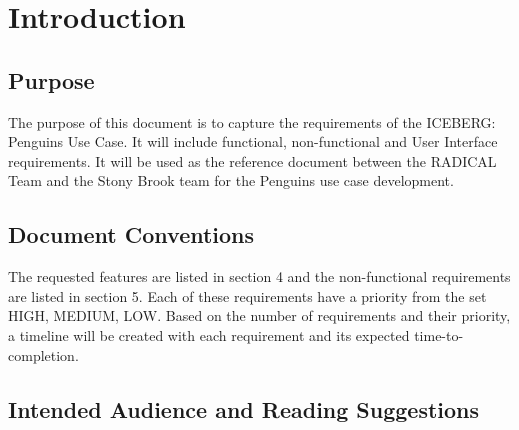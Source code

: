 \documentclass{scrreprt}
\begin{document}
\chapter{Introduction}

\section{Purpose}
\iffalse
$<$Identify the product whose software requirements are specified in this 
document, including the revision or release number. Describe the scope of the 
product that is covered by this SRS, particularly if this SRS describes only 
part of the system or a single subsystem.$>$
\fi

The purpose of this document is to capture the requirements of the ICEBERG: Penguins
Use Case. It will include functional, non-functional and User Interface requirements.
It will be used as the reference document between the RADICAL Team and the Stony 
Brook team for the Penguins use case development.

\section{Document Conventions}
\iffalse
$<$Describe any standards or typographical conventions that were followed when 
writing this SRS, such as fonts or highlighting that have special significance.  
For example, state whether priorities  for higher-level requirements are assumed 
to be inherited by detailed requirements, or whether every requirement statement 
is to have its own priority.$>$
\fi

The requested features are listed in section 4 and the non-functional requirements are
listed in section 5. Each of these requirements have a priority from the set {HIGH,
MEDIUM, LOW}. Based on the number of requirements and their priority, a timeline
will be created with each requirement and its expected time-to-completion.


\section{Intended Audience and Reading Suggestions}
\iffalse
$<$Describe the different types of reader that the document is intended for, 
such as developers, project managers, marketing staff, users, testers, and 
documentation writers. Describe what the rest of this SRS contains and how it is 
organized. Suggest a sequence for reading the document, beginning with the 
overview sections and proceeding through the sections that are most pertinent to 
each reader type.$>$
\fi
\end{document}

